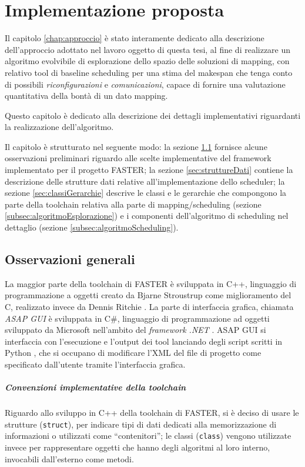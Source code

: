 \chapter{Implementazione proposta}
\label{chap:implementazione}
\vspace{1cm}
Il capitolo \ref{chap:approccio} è stato interamente dedicato alla descrizione 
dell'approccio adottato nel lavoro oggetto di questa tesi, al fine di 
realizzare un algoritmo evolvibile di esplorazione dello spazio delle soluzioni di mapping,
con relativo tool di baseline scheduling per una stima del makespan che tenga conto di possibili 
\emph{riconfigurazioni} e \emph{comunicazioni}, capace di fornire una 
valutazione quantitativa della bontà di un dato mapping.

Questo capitolo è dedicato alla descrizione dei dettagli implementativi 
riguardanti la realizzazione dell'algoritmo.

Il capitolo è strutturato nel seguente modo: la sezione 
\ref{sec:osservazioniGenerali} fornisce alcune osservazioni preliminari 
riguardo alle scelte implementative del framework implementato per il
progetto \ac{FASTER}; la sezione 
\ref{sec:struttureDati} contiene la descrizione delle strutture dati relative 
all'implementazione dello scheduler; la sezione \ref{sec:classiGerarchie} 
descrive le classi e le gerarchie che compongono la parte della toolchain 
relativa alla parte di mapping/scheduling (sezione 
\ref{subsec:algoritmoEsplorazione}) e i componenti dell'algoritmo di scheduling 
nel dettaglio (sezione \ref{subsec:algoritmoScheduling}).

\section{Osservazioni generali}
\label{sec:osservazioniGenerali}
La maggior parte della toolchain di \ac{FASTER} è sviluppata in C++, 
linguaggio di programmazione a oggetti creato da Bjarne Stroustrup 
\cite{CppStroustrup} come miglioramento del C, realizzato invece da Dennis Ritchie 
\cite{CKernighanRitchie}. La parte di interfaccia grafica, chiamata \emph{ASAP 
GUI} è sviluppata in C\#, linguaggio di programmazione ad oggetti sviluppato da 
Microsoft nell'ambito del \emph{framework .NET} \cite{ProCSharp}. ASAP GUI 
si interfaccia con l'esecuzione e l'output dei tool lanciando degli script scritti
in Python \cite{ThinkPython}, che si occupano di modificare l'XML del file di progetto
come specificato dall'utente tramite l'interfaccia grafica.
\paragraph{Convenzioni implementative della toolchain}
Riguardo allo sviluppo in C++ della toolchain di \ac{FASTER}, si è deciso di 
usare le strutture (\verb+struct+), per indicare tipi di dati dedicati alla 
memorizzazione di informazioni o utilizzati come ``contenitori''; le classi 
(\verb+class+) vengono utilizzate invece per rappresentare oggetti che hanno 
degli algoritmi al loro interno, invocabili dall'esterno come metodi.

